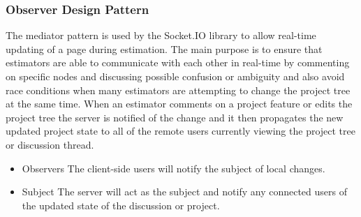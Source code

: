 \subsubsection{Observer Design Pattern}
The mediator pattern is used by the Socket.IO library to allow real-time updating of a page during estimation. The main purpose is to ensure that estimators are able to communicate with each other in real-time by commenting on specific nodes and discussing possible confusion or ambiguity and also avoid race conditions when many estimators are attempting to change the project tree at the same time. When an estimator comments on a project feature or edits the project tree the server is notified of the change and it then propagates the new updated project state to all of the remote users currently viewing the project tree or discussion thread.
\begin{itemize}
	\item{Observers}
	\newline
	The client-side users will notify the subject of local changes.
	\item{Subject}
	\newline
	The server will act as the subject and notify any connected users of the updated state of the discussion or project.
\end{itemize}